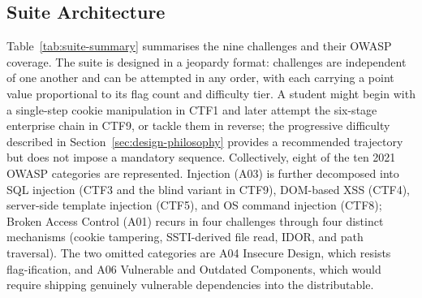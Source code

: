 \subsection{Suite Architecture}
\label{sec:challenge-architecture}

Table~\ref{tab:suite-summary} summarises the nine
challenges and their OWASP coverage. The suite is designed
in a jeopardy format: challenges are independent of one
another and can be attempted in any order, with each
carrying a point value proportional to its flag count and
difficulty tier. A student might begin with a single-step
cookie manipulation in CTF1 and later attempt the six-stage
enterprise chain in CTF9, or tackle them in reverse; the
progressive difficulty described in
Section~\ref{sec:design-philosophy} provides a recommended
trajectory but does not impose a mandatory sequence.
Collectively, eight of the ten 2021 OWASP categories are
represented. Injection (A03) is further decomposed into SQL
injection (CTF3 and the blind variant in CTF9), DOM-based
XSS (CTF4), server-side template injection (CTF5), and OS
command injection (CTF8); Broken Access Control (A01)
recurs in four challenges through four distinct mechanisms
(cookie tampering, SSTI-derived file read, IDOR, and path
traversal). The two omitted categories are A04 Insecure
Design, which resists flag-ification, and A06 Vulnerable
and Outdated Components, which would require shipping
genuinely vulnerable dependencies into the distributable.

